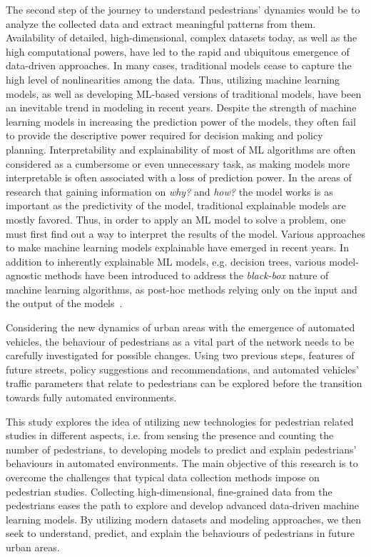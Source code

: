 The second step of the journey to understand pedestrians' dynamics would be to analyze the collected data and extract meaningful patterns from them. Availability of detailed, high-dimensional, complex datasets today, as well as the high computational powers, have led to the rapid and ubiquitous emergence of data-driven approaches. In many cases, traditional models cease to capture the high level of nonlinearities among the data. Thus, utilizing machine learning models, as well as developing ML-based versions of traditional models, have been an inevitable trend in modeling in recent years. Despite the strength of machine learning models in increasing the prediction power of the models, they often fail to provide the descriptive power required for decision making and policy planning. Interpretability and explainability of most of ML algorithms are often considered as a cumbersome or even unnecessary task, as making models more interpretable is often associated with a loss of prediction power. In the areas of research that gaining information on \textit{why?} and \textit{how?} the model works is as important as the predictivity of the model, traditional explainable models are mostly favored. Thus, in order to apply an ML model to solve a problem, one must first find out a way to interpret the results of the model. Various approaches to make machine learning models explainable have emerged in recent years. In addition to inherently explainable ML models, e.g. decision trees, various model-agnostic methods have been introduced to address the \textit{black-box} nature of machine learning algorithms, as post-hoc methods relying only on the input and the output of the models~\citep{molnar2019interpretable}.

Considering the new dynamics of urban areas with the emergence of automated vehicles, the behaviour of pedestrians as a vital part of the network needs to be carefully investigated for possible changes. Using two previous steps, features of future streets, policy suggestions and recommendations, and automated vehicles’ traffic parameters that relate to pedestrians can be explored before the transition towards fully automated environments.     

This study explores the idea of utilizing new technologies for pedestrian related studies in different aspects, i.e. from sensing the presence and counting the number of pedestrians, to developing models to predict and explain pedestrians' behaviours in automated environments. The main objective of this research is to overcome the challenges that typical data collection methods impose on pedestrian studies. Collecting high-dimensional, fine-grained data from the pedestrians eases the path to explore and develop advanced data-driven machine learning models. By utilizing modern datasets and modeling approaches, we then seek to understand, predict, and explain the behaviours of pedestrians in future urban areas.


